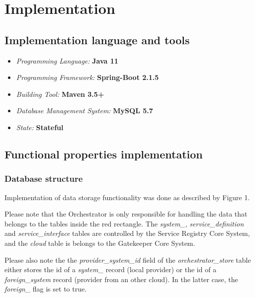 \documentclass[a4paper]{arrowhead}
\begin{document}
\newpage

\section{Implementation}
\label{sec:implementation}

\subsection {Implementation language and tools}

\begin{itemize}
\item \emph{Programming Language:} \textbf{Java 11}
\item \emph{Programming Framework:} \textbf{Spring-Boot 2.1.5}
\item \emph{Building Tool:} \textbf{Maven 3.5+}
\item \emph{Database Management System:} \textbf{MySQL 5.7}
\item \emph{State:} \textbf{Stateful}
\end{itemize} 

\subsection {Functional properties implementation}

\subsubsection{Database structure}

Implementation of data storage functionality was done as described by Figure 1. 

Please note that the Orchestrator is only responsible for handling the data that belongs to the tables inside the red rectangle. The \textit{system\_}, \textit{service\_definition} and \textit{service\_interface} tables are controlled by the Service Registry Core System, and the \textit{cloud} table is belongs to the Gatekeeper Core System.

Please also note the the \textit{provider\_system\_id} field of the \textit{orchestrator\_store} table either stores the id of a \textit{system\_} record (local provider) or the id of a \textit{foreign\_system} record (provider from an other cloud). In the latter case, the \textit{foreign\_} flag is set to true.
\end{document}
